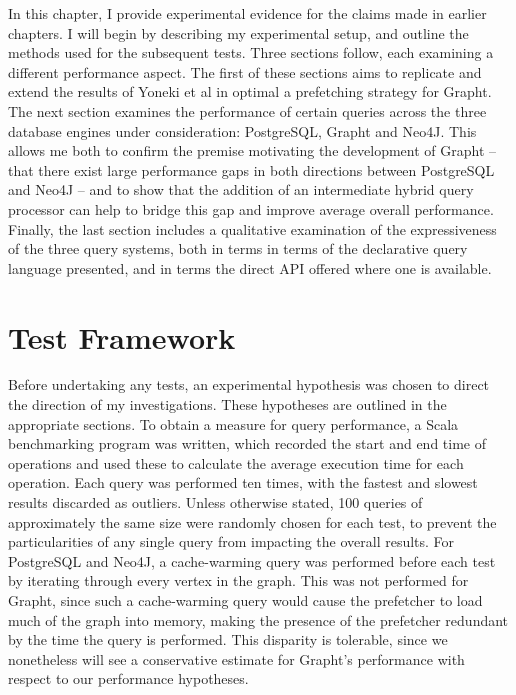 
In this chapter, I provide experimental evidence for the claims made
in earlier chapters. I will begin by describing my experimental setup, and
outline the methods used for the subsequent tests. Three sections follow, each
examining a different performance aspect. The first of these sections aims to
replicate and extend the results of Yoneki et al\cite{crackle} in
optimal a prefetching strategy for Grapht. The next section examines the
performance of certain queries across the three database engines under
consideration: PostgreSQL, Grapht and Neo4J. This allows me both to confirm
the premise motivating the development of Grapht -- that there exist large
performance gaps in both directions between PostgreSQL and Neo4J -- and to show
that the addition of an intermediate hybrid query processor can help to bridge
this gap and improve average overall performance. Finally, the last section
includes a qualitative examination of the expressiveness of the
three query systems, both in terms in terms of the declarative query language
presented, and in terms the direct API offered where one is available.

\section{Test Framework}

Before undertaking any tests, an experimental hypothesis was chosen to direct
the direction of my investigations. These hypotheses are outlined in the
appropriate sections. To obtain a measure for query performance, a Scala
benchmarking program was written, which recorded the start and end time of
operations and used these to calculate the average execution time for each operation.
Each  query was performed ten times, with the fastest and slowest results
discarded as outliers. Unless otherwise stated, 100 queries of approximately
the same size were randomly chosen for each test, to prevent the
particularities of any single query from impacting the overall results. For PostgreSQL and Neo4J, a cache-warming query was performed before
each test by iterating through every vertex in the graph. This was not
performed for Grapht, since such a cache-warming query would cause the
prefetcher to load much of the graph into memory, making  the presence of the
prefetcher redundant by the time the query is performed. This disparity is
tolerable, since we nonetheless will see  a conservative estimate for Grapht's
performance with respect to our performance hypotheses.

